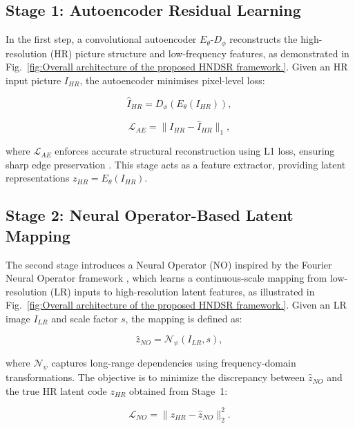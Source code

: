 \documentclass[conference]{IEEEtran}
\begin{document}
\subsection{Stage 1: Autoencoder Residual Learning}
In the first step, a convolutional autoencoder $E_{\theta}$-$D_{\phi}$ reconstructs the high-resolution (HR) picture structure and low-frequency features, as demonstrated in Fig.~\ref{fig:Overall architecture of the proposed HNDSR framework.}. 
 Given an HR input picture $I_{HR}$, the autoencoder minimises pixel-level loss:

\begin{equation}
\hat{I}_{HR} = D_{\phi}(E_{\theta}(I_{HR})),
\end{equation}

\begin{equation}
\mathcal{L}_{AE} = \|I_{HR} - \hat{I}_{HR}\|_1,
\end{equation}

where $\mathcal{L}_{AE}$ enforces accurate structural reconstruction using L1 loss, ensuring sharp edge preservation \cite{lim2017enhanced, ledig2017photo}. This stage acts as a feature extractor, providing latent representations $z_{HR} = E_{\theta}(I_{HR})$.


\subsection{Stage 2: Neural Operator-Based Latent Mapping}
The second stage introduces a Neural Operator (NO) inspired by the Fourier Neural Operator framework \cite{li2020fourier}, which learns a continuous-scale mapping from low-resolution (LR) inputs to high-resolution latent features, as illustrated in Fig.~\ref{fig:Overall architecture of the proposed HNDSR framework.}. 
Given an LR image $I_{LR}$ and scale factor $s$, the mapping is defined as:

\begin{equation}
\hat{z}_{NO} = \mathcal{N}_{\psi}(I_{LR}, s),
\end{equation}

where $\mathcal{N}_{\psi}$ captures long-range dependencies using frequency-domain transformations. The objective is to minimize the discrepancy between $\hat{z}_{NO}$ and the true HR latent code $z_{HR}$ obtained from Stage~1:

\begin{equation}
\mathcal{L}_{NO} = \|z_{HR} - \hat{z}_{NO}\|_2^2.
\end{equation}
\end{document}
